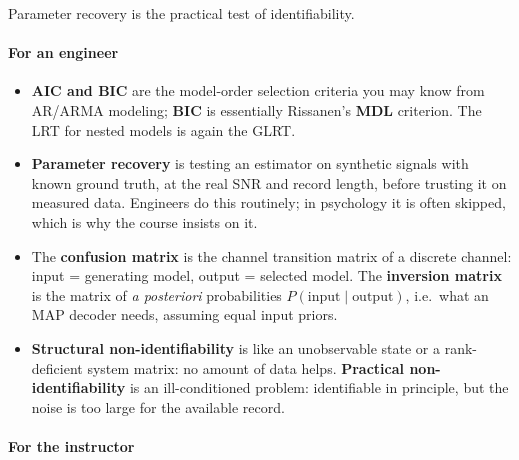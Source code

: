 Parameter recovery is the practical test of identifiability.

\paragraph{For an engineer}

\begin{itemize}
\tightlist
\item
  \textbf{AIC and BIC} are the model-order selection criteria you may
  know from AR/ARMA modeling; \textbf{BIC} is essentially Rissanen's
  \textbf{MDL} criterion. The LRT for nested models is again the GLRT.
\item
  \textbf{Parameter recovery} is testing an estimator on synthetic
  signals with known ground truth, at the real SNR and record length,
  before trusting it on measured data. Engineers do this routinely; in
  psychology it is often skipped, which is why the course insists on it.
\item
  The \textbf{confusion matrix} is the channel transition matrix of a
  discrete channel: input = generating model, output = selected model.
  The \textbf{inversion matrix} is the matrix of \emph{a posteriori}
  probabilities \(P(\text{input} \mid \text{output})\), i.e.~what an MAP
  decoder needs, assuming equal input priors.
\item
  \textbf{Structural non-identifiability} is like an unobservable state
  or a rank-deficient system matrix: no amount of data helps.
  \textbf{Practical non-identifiability} is an ill-conditioned problem:
  identifiable in principle, but the noise is too large for the
  available record.
\end{itemize}

\paragraph{For the instructor}

